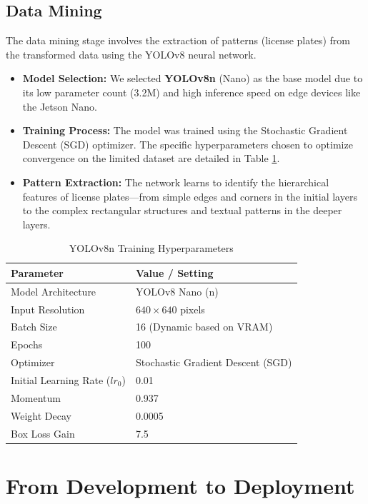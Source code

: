 \subsection{Data Mining}
\label{subsec:data_mining}

The data mining stage involves the extraction of patterns (license plates) from the transformed data using the YOLOv8 neural network.

\begin{itemize}
	\item \textbf{Model Selection:} We selected \textbf{YOLOv8n} (Nano) as the base model due to its low parameter count (3.2M) and high inference speed on edge devices like the Jetson Nano.
	\item \textbf{Training Process:} The model was trained using the Stochastic Gradient Descent (SGD) optimizer. The specific hyperparameters chosen to optimize convergence on the limited dataset are detailed in Table \ref{tab:hyperparams}.
	\item \textbf{Pattern Extraction:} The network learns to identify the hierarchical features of license plates---from simple edges and corners in the initial layers to the complex rectangular structures and textual patterns in the deeper layers.
\end{itemize}

\begin{table}[htbp]
	\centering
	\caption{YOLOv8n Training Hyperparameters}
	\label{tab:hyperparams}
	\begin{tabular}{@{}ll@{}}
		\toprule
		\textbf{Parameter} & \textbf{Value / Setting} \\ \midrule
		Model Architecture & YOLOv8 Nano (n) \\
		Input Resolution & $640 \times 640$ pixels \\
		Batch Size & 16 (Dynamic based on VRAM) \\
		Epochs & 100 \\
		Optimizer & Stochastic Gradient Descent (SGD) \\
		Initial Learning Rate ($lr_0$) & 0.01 \\
		Momentum & 0.937 \\
		Weight Decay & 0.0005 \\
		Box Loss Gain & 7.5 \\ \bottomrule
	\end{tabular}
\end{table}

\section{From Development to Deployment}
\label{sec:dev_to_deploy}


